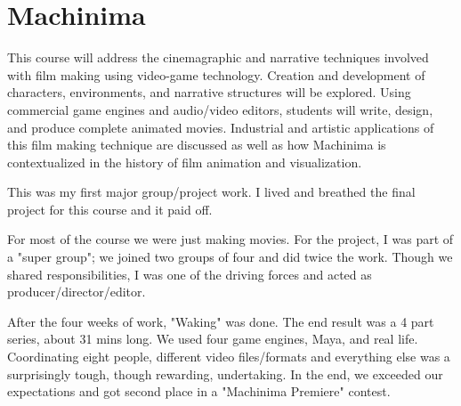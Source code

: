 \section{Machinima}

\begin{meta}
\end{meta}

\coursedesc
This course will address the cinemagraphic and narrative techniques
involved with film making using video-game technology. Creation and
development of characters, environments, and narrative structures will
be explored. Using commercial game engines and audio/video editors,
students will write, design, and produce complete animated movies.
Industrial and artistic applications of this film making technique are
discussed as well as how Machinima is contextualized in the history of
film animation and visualization.

\courseself
This was my first major group/project work. I lived and breathed the
final project for this course and it paid off.

For most of the course we were just making movies. For the project, I
was part of a "super group"; we joined two groups of four and did twice
the work. Though we shared responsibilities, I was one of the driving
forces and acted as producer/director/editor.

After the four weeks of work, "Waking" was done. The end result was a 4
part series, about 31 mins long. We used four game engines, Maya, and
real life. Coordinating eight people, different video files/formats and
everything else was a surprisingly tough, though rewarding, undertaking.
In the end, we exceeded our expectations and got second place in a
"Machinima Premiere" contest.

